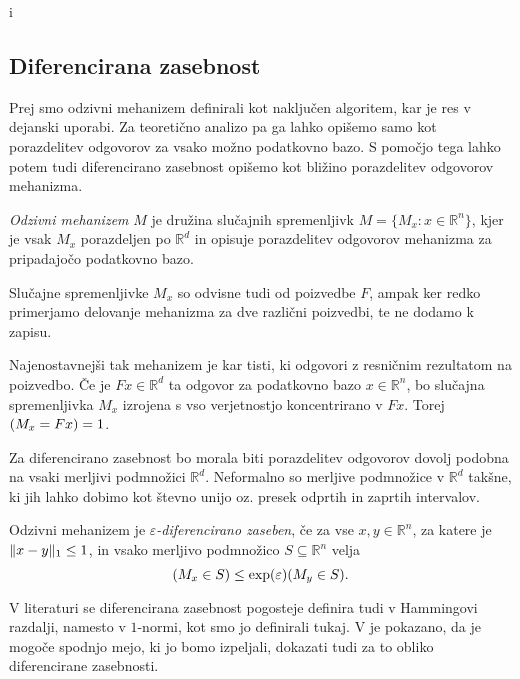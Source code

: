 i\documentclass[mat1]{fmfdelo}
\DeclarePairedDelimiter{\norm}{\lVert}{\rVert}
\newcommand{\R}{\mathbb R}
\let\P\relax \DeclareMathOperator*{\P}{\mathbb P}
\begin{document}
\subsection{Diferencirana zasebnost}

Prej smo odzivni mehanizem definirali kot naključen algoritem, kar je res v dejanski uporabi. Za teoretično analizo pa ga lahko opišemo samo kot porazdelitev odgovorov za vsako možno podatkovno bazo. S pomočjo tega lahko potem tudi diferencirano zasebnost opišemo kot bližino porazdelitev odgovorov mehanizma.

\begin{definicija}
	{\em Odzivni mehanizem} $M$ je družina slučajnih spremenljivk $M = \{M_x: x \in \R^n \}$, kjer je vsak $M_x$ porazdeljen po $\R^d$ in opisuje porazdelitev odgovorov mehanizma za pripadajočo podatkovno bazo.
\end{definicija}
\begin{opomba}
    Slučajne spremenljivke $M_x$ so odvisne tudi od poizvedbe $F$, ampak ker redko primerjamo delovanje mehanizma za dve različni poizvedbi, te ne dodamo k zapisu.
\end{opomba}

\begin{primer}
    Najenostavnejši tak mehanizem je kar tisti, ki odgovori z resničnim rezultatom na poizvedbo. Če je $Fx \in \R^d$ ta odgovor za podatkovno bazo $x \in \R^n$, bo slučajna spremenljivka $M_x$ izrojena s vso verjetnostjo koncentrirano v $Fx$. Torej $\P(M_x=Fx)=1$.
\end{primer}

Za diferencirano zasebnost bo morala biti porazdelitev odgovorov dovolj podobna na vsaki merljivi podmnožici $\R^d$. Neformalno so merljive podmnožice v $\R^d$ takšne, ki jih lahko dobimo kot števno unijo oz. presek odprtih in zaprtih intervalov.

\begin{definicija}
	Odzivni mehanizem je {\em $\varepsilon$-diferencirano zaseben}, če za vse $x,y \in \R^n$, za katere je $\norm{x-y}_1 \leq 1$, in vsako merljivo podmnožico $S \subseteq \R^n$ velja
	\begin{equation*}
	    \P(M_x \in S) \leq \exp(\varepsilon) \P(M_y \in S).
	\end{equation*}
\end{definicija}

\begin{opomba}
    V literaturi se diferencirana zasebnost pogosteje definira tudi v Hammingovi razdalji, namesto v $1$-normi, kot smo jo definirali tukaj. V \cite{on-geometry} je pokazano, da je mogoče spodnjo mejo, ki jo bomo izpeljali, dokazati tudi za to obliko diferencirane zasebnosti.
\end{opomba}
\end{document}
